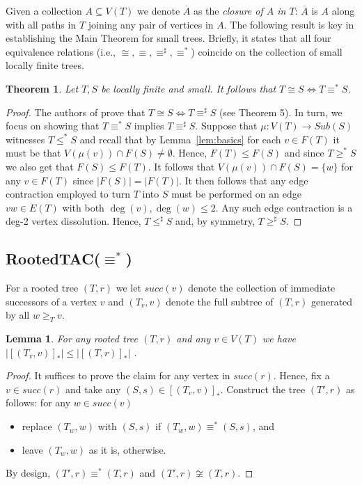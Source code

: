 \documentclass[12pt]{amsart}
\newtheorem{theorem}{Theorem}[section]
\newtheorem{lemma}{Lemma}[section]
\numberwithin{mytheorem}{section} %
\numberwithin{mylemma}{section} %
\numberwithin{mycorollary}{section} %
\begin{document}
Given a collection $A \subseteq V(T)$ we denote $\overline{A}$ as the {\it closure of $A$ in $T$}: $\overline{A}$ is $A$ along with all paths in $T$ joining any pair of vertices in $A$. The following result is key in establishing the Main Theorem for small trees. Briefly, it states that all four equivalence relations (i.e., $\cong, \equiv,\equiv^\sharp , \equiv^*$) coincide on the collection of small locally finite trees.

\begin{theorem}\label{thm:equiv} Let $T,S$ be locally finite and small. It follows that $T\cong S \Leftrightarrow T\equiv^*S$. 
\end{theorem}
\begin{proof} 
The authors of \cite{BP1} prove that $T\cong S \Leftrightarrow T\equiv^\sharp S$ (see Theorem 5). In turn, we focus on showing that $T\equiv^*S$ implies $T\equiv^\sharp S$. Suppose that $\mu: V(T) \to Sub(S)$ witnesses $T \leq^* S$ and recall that by Lemma~\ref{lem:basics} for each $v\in F(T)$ it must be that $V(\mu(v))\cap F(S) \not = \emptyset$. Hence, $F(T) \leq F(S)$ and since $T \geq^* S$ we also get that $F(S) \leq F(T)$. It follows that $V(\mu(v))\cap F(S) = \{w\}$ for any $v\in F(T)$ since $|F(S)| = |F(T)|$. It then follows that any edge contraction employed to turn $T$ into $S$ must be performed on an edge $vw \in E(T)$ with both $\deg(v), \deg(w) \leq 2$. Any such edge contraction is a deg-2 vertex dissolution. Hence, $T \leq^\sharp S$ and, by symmetry, $T \geq^\sharp S$. 
\end{proof}




\subsection{RootedTAC($\equiv^*$)} \label{sec:rootedSmall}
 For a rooted tree $(T,r)$ we let $succ(v) $ denote the collection of immediate successors of a vertex $v$ and $(T_v,v)$ denote the full subtree of $(T,r)$ generated by all $w\geq_T v$.

\begin{lemma} For any rooted tree $(T,r)$ and any $v\in V(T)$ we have $|[(T_v,v)]_*|\leq |[(T,r)]_*|$ . 
\end{lemma}
\begin{proof} It suffices to prove the claim for any vertex in $succ(r)$. Hence, fix a $v\in succ(r)$ and take any $(S,s) \in [(T_v,v)]_*$. Construct the tree $(T',r)$ as follows: for any $w\in succ(v)$
\begin{itemize}
\item replace $(T_w,w)$ with $(S,s)$ if $(T_w,w) \equiv^* (S,s)$, and
\item leave $(T_w,w)$ as it is, otherwise.
\end{itemize}
By design, $(T',r) \equiv^* (T,r)$ and $(T',r) \not \cong (T,r)$.
\end{proof}
\end{document}
